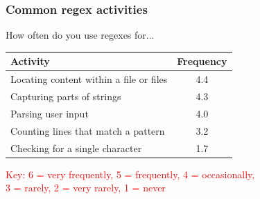 \begin{frame}
\frametitle{Common regex activities}

\begin{block}{How often do you use regexes for... }

\begin{center}
\begin{tabular}{l|c}
\toprule
\textbf{Activity} & \textbf{Frequency} \\  \hline 
Locating content within a file or files & 4.4\\ \hline 
Capturing parts of strings & 4.3 \\ \hline 
Parsing user input & 4.0\\  \hline
Counting lines that match a pattern & 3.2 \\ \hline
Checking for a single character & 1.7\\ \hline
\bottomrule
\end{tabular}
\end{center}
\end{block}
\textcolor{red}{Key: 6 = very frequently, 5 = frequently, 4 = occasionally, \\3 = rarely, 2 = very rarely, 1 = never}

\end{frame}


%
%
%

